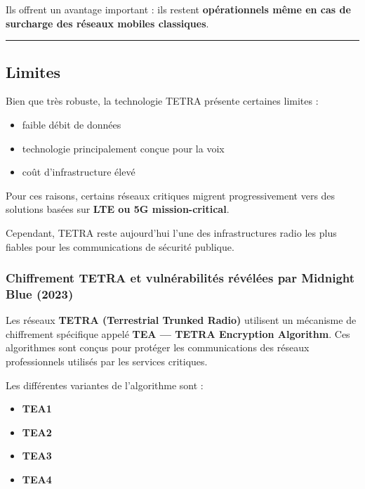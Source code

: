 \documentclass[
  french,
]{article}
\providecommand{\tightlist}{%
  \setlength{\itemsep}{0pt}\setlength{\parskip}{0pt}}
\begin{document}
Ils offrent un avantage important : ils restent \textbf{opérationnels
même en cas de surcharge des réseaux mobiles classiques}.

\begin{center}\rule{0.5\linewidth}{0.5pt}\end{center}

\subsection{Limites}\label{limites}

Bien que très robuste, la technologie TETRA présente certaines limites :

\begin{itemize}
\tightlist
\item
  faible débit de données
\item
  technologie principalement conçue pour la voix
\item
  coût d'infrastructure élevé
\end{itemize}

Pour ces raisons, certains réseaux critiques migrent progressivement
vers des solutions basées sur \textbf{LTE ou 5G mission-critical}.

Cependant, TETRA reste aujourd'hui l'une des infrastructures radio les
plus fiables pour les communications de sécurité publique.

\subsubsection{Chiffrement TETRA et vulnérabilités révélées par Midnight
Blue
(2023)}\label{chiffrement-tetra-et-vulnuxe9rabilituxe9s-ruxe9vuxe9luxe9es-par-midnight-blue-2023}

Les réseaux \textbf{TETRA (Terrestrial Trunked Radio)} utilisent un
mécanisme de chiffrement spécifique appelé \textbf{TEA --- TETRA
Encryption Algorithm}. Ces algorithmes sont conçus pour protéger les
communications des réseaux professionnels utilisés par les services
critiques.

Les différentes variantes de l'algorithme sont :

\begin{itemize}
\tightlist
\item
  \textbf{TEA1}
\item
  \textbf{TEA2}
\item
  \textbf{TEA3}
\item
  \textbf{TEA4}
\end{itemize}
\end{document}
